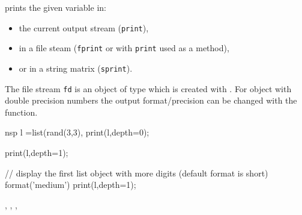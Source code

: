 \begin{mandescription}
  prints the given variable in:
\begin{itemize}
\item the current output stream (\verb+print+), 
\item in a file steam (\verb+fprint+ or with \verb+print+ used as a method),
\item or in a string matrix (\verb+sprint+).
\end{itemize}
The file stream \verb+fd+ is an object of type  which 
is created with . For object with double precision numbers
the output format/precision can be changed with the  function. 
\end{mandescription}
\begin{examples}
  \begin{mintednsp}{nsp}
    l =list(rand(3,3),%
    print(l,depth=0);

    print(l,depth=1);

    // display the first list object with more digits (default format is short)
    format('medium')
    print(l,depth=1);
  \end{mintednsp}
\end{examples}
\begin{manseealso}
  , , , 
\end{manseealso}

